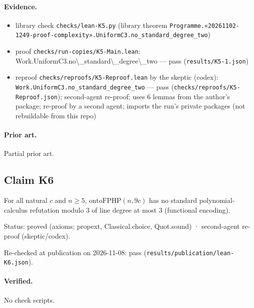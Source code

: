 \documentclass{article}
\begin{document}
\paragraph{Evidence.}
\begin{itemize}
\item library check \texttt{checks/lean-K5.py} (library theorem \texttt{Programme.«20261102-1249-proof-complexity».UniformC3.no\_standard\_degree\_two})
\item proof \texttt{checks/run-copies/K5-Main.lean}: Work.UniformC3.no\textbackslash{}\_standard\textbackslash{}\_degree\textbackslash{}\_two --- pass (\texttt{results/K5-1.json})
\item reproof \texttt{checks/reproofs/K5-Reproof.lean} by the skeptic (codex): \texttt{Work.UniformC3.no\_standard\_degree\_two} --- pass (\texttt{checks/reproofs/K5-Reproof.json}); second-agent re-proof; uses 6 lemmas from the author's package; re-proof by a second agent; imports the run's private packages (not rebuildable from this repo)
\end{itemize}

\paragraph{Prior art.} Partial prior art.

\subsection*{Claim K6}

For all natural $c$ and $n\ge5$, $\mathrm{ontoFPHP}(n,9c)$ has no standard polynomial-calculus refutation modulo $3$ of line degree at most $3$ (functional encoding).

Status: proved (axioms: propext, Classical.choice, Quot.sound) · second-agent re-proof (skeptic/codex).

Re-checked at publication on 2026-11-08: pass (\texttt{results/publication/lean-K6.json}).

\paragraph{Verified.}
No check scripts.
\end{document}

